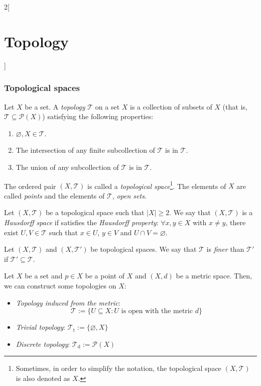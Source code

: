 \documentclass[../../../main.tex]{subfiles}
\begin{document}
\begin{multicols}{2}[\section{Topology}]
  \subsubsection{Topological spaces}
  \begin{definition}
    Let $X$ be a set. A \textit{topology} $\mathcal{T}$ on a set $X$ is a collection of subsets of $X$ (that is, $\mathcal{T}\subseteq\mathcal{P}(X)$) satisfying the following properties:
    \begin{enumerate}
      \item $\varnothing, X\in\mathcal{T}$.
      \item The intersection of any finite subcollection of $\mathcal{T}$ is in $\mathcal{T}$.
      \item The union of any subcollection of $\mathcal{T}$ is in $\mathcal{T}$.
    \end{enumerate}
    The ordered pair $(X,\mathcal{T})$ is called a \textit{topological space}\footnote{Sometimes, in order to simplify the notation, the topological space $(X,\mathcal{T})$ is also denoted as $X$.}. The elements of $X$ are called \textit{points} and the elements of $\mathcal{T}$, \textit{open sets}.
  \end{definition}
  \begin{definition}
    Let $(X,\mathcal{T})$ be a topological space such that $|X|\geq 2$. We say that $(X,\mathcal{T})$ is a \textit{Hausdorff space} if satisfies the \textit{Hausdorff property}: $\forall x,y\in X$ with $x\ne y$, there exist $U,V\in\mathcal{T}$ such that $x\in U$, $y\in V$ and $U\cap V=\varnothing$.
  \end{definition}
  \begin{definition}
    Let $(X,\mathcal{T})$ and $(X,\mathcal{T}')$ be topological spaces. We say that $\mathcal{T}$ is \textit{finer} than $\mathcal{T}'$ if $\mathcal{T}'\subseteq\mathcal{T}$.
  \end{definition}
  \begin{prop}
    Let $X$ be a set and $p\in X$ be a point of $X$ and $(X,d)$ be a metric space. Then, we can construct some topologies on $X$:
    \begin{itemize}
      \item \textit{Topology induced from the metric}: $$\mathcal{T}:=\{U\subseteq X:U\text{ is open with the metric }d\}$$
      \item \textit{Trivial topology}: $\mathcal{T}_\text{t}:=\{\varnothing,X\}$
      \item \textit{Discrete topology}: $\mathcal{T}_\text{d}:=\mathcal{P}(X)$

\end{itemize}
\end{prop}
\end{multicols}
\end{document}
